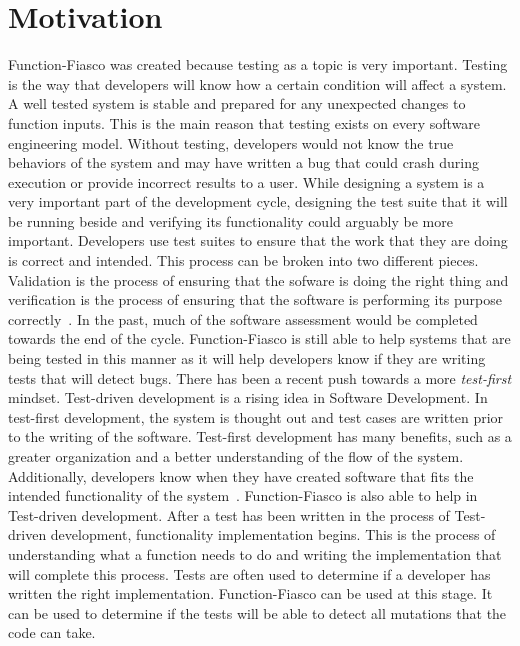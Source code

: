 \section{Motivation} \label{sec:motivation}
%
Function-Fiasco was created because testing as a topic is very important. Testing is the way that developers will know how a certain condition will affect a system. A well tested system is stable and prepared for any unexpected changes to function inputs. This is the main reason that testing exists on every software engineering model. Without testing, developers would not know the true behaviors of the system and may have written a bug that could crash during execution or provide incorrect results to a user. While designing a system is a very important part of the development cycle, designing the test suite that it will be running beside and verifying its functionality could arguably be more important. Developers use test suites to ensure that the work that they are doing is correct and intended. This process can be broken into two different pieces. Validation is the process of ensuring that the sofware is doing the right thing and verification is the process of ensuring that the software is performing its purpose correctly~\cite{friedman_voas_1995}. In the past, much of the software assessment would be completed towards the end of the cycle. Function-Fiasco is still able to help systems that are being tested in this manner as it will help developers know if they are writing tests that will detect bugs. There has been a recent push towards a more \textit{test-first} mindset. Test-driven development is a rising idea in Software Development. In test-first development, the system is thought out and test cases are written prior to the writing of the software. Test-first development has many benefits, such as a greater organization and a better understanding of the flow of the system. Additionally, developers know when they have created software that fits the intended functionality of the system~\cite{fucci2017dissection}. Function-Fiasco is also able to help in Test-driven development. After a test has been written in the process of Test-driven development, functionality implementation begins. This is the process of understanding what a function needs to do and writing the implementation that will complete this process. Tests are often used to determine if a developer has written the right implementation. Function-Fiasco can be used at this stage. It can be used to determine if the tests will be able to detect all mutations that the code can take.

